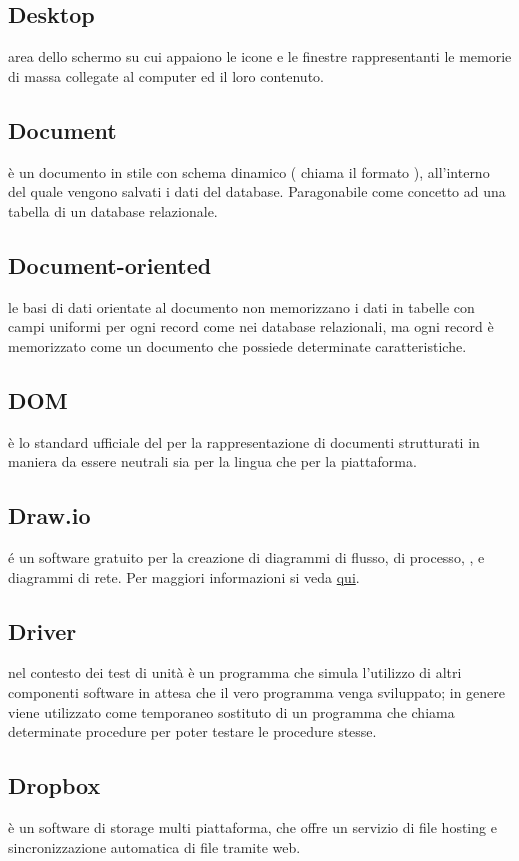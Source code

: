 \documentclass[12pt,a4paper]{article}
\begin{document}
\subsection{Desktop} 
 area dello schermo su cui appaiono le icone e le finestre rappresentanti le memorie di massa collegate al computer ed il loro contenuto.

\subsection{Document} 
è un documento in stile  con schema dinamico ( chiama il formato ), all'interno del quale vengono salvati i dati del database. Paragonabile come concetto ad una tabella di un database relazionale.

\subsection{Document-oriented} 
 le basi di dati orientate al documento non memorizzano i dati in tabelle con campi uniformi per ogni record come nei database relazionali, ma ogni record è memorizzato come un documento che possiede determinate caratteristiche.

\subsection{DOM} 
 è lo standard ufficiale del  per la rappresentazione di documenti strutturati in maniera da essere neutrali sia per la lingua che per la piattaforma.

\subsection{Draw.io} 
 é un software gratuito per la creazione di diagrammi di flusso, di processo, , e diagrammi di rete. Per maggiori informazioni si veda \href{https://www.draw.io}{qui}.

\subsection{Driver} 
 nel contesto dei test di unità è un programma che simula l'utilizzo di altri componenti software in attesa che il vero programma venga sviluppato; in genere viene utilizzato come temporaneo sostituto di un programma che chiama determinate procedure per poter testare le procedure stesse.

\subsection{Dropbox} 
 è un software di  storage multi piattaforma, che offre un servizio di file hosting e sincronizzazione automatica di file tramite web.
\end{document}
